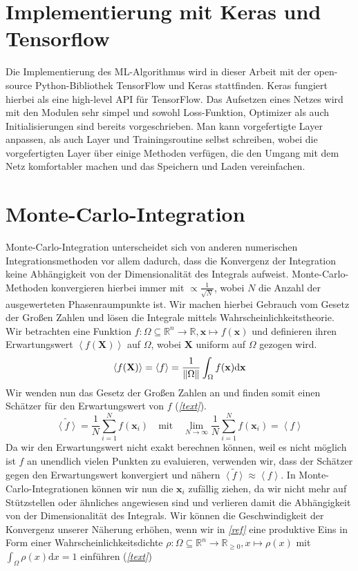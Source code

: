 \section{Implementierung mit Keras und Tensorflow}
Die Implementierung des ML-Algorithmus wird in dieser Arbeit mit der open-source Python-Bibliothek TensorFlow und Keras stattfinden. Keras fungiert hierbei als eine high-level API für TensorFlow. Das Aufsetzen eines Netzes wird mit den Modulen sehr simpel und sowohl Loss-Funktion, Optimizer als auch Initialisierungen sind bereits vorgeschrieben. Man kann vorgefertigte Layer anpassen, als auch Layer und Trainingsroutine selbst schreiben, wobei die vorgefertigten Layer über einige Methoden verfügen, die den Umgang mit dem Netz komfortabler machen und das Speichern und Laden vereinfachen. 
\section{Monte-Carlo-Integration}
Monte-Carlo-Integration unterscheidet sich von anderen numerischen Integrationsmethoden vor allem dadurch, dass die Konvergenz der Integration keine Abhängigkeit von der Dimensionalität des Integrals aufweist. Monte-Carlo-Methoden konvergieren hierbei immer mit $\propto \frac{1}{\sqrt{N}} $, wobei $N$ die Anzahl der ausgewerteten Phasenraumpunkte ist. Wir machen hierbei Gebrauch vom Gesetz der Großen Zahlen und lösen die Integrale mittels Wahrscheinlichkeitstheorie. \\
\newline
Wir betrachten eine Funktion $f: \Omega \subseteq \mathbb{R}^n \rightarrow \mathbb{R}, \mathbf{x} \mapsto f(\mathbf{x})$ und definieren ihren Erwartungswert $\left\langle f(\mathbf{X})\right\rangle $ auf $\Omega$, wobei $\mathbf{X}$ uniform auf $\Omega$ gezogen wird.
\begin{equation}
\left\langle f(\mathbf{X})\right\rangle  = \left\langle f\right\rangle  = \frac{1}{\norm{\Omega}}\int_{\Omega} f(\mathbf{x}) \text{d}\mathbf{x} 
\end{equation}
Wir wenden nun das Gesetz der Großen Zahlen an und finden somit einen Schätzer für den Erwartungswert von $f$ (\textit{\autoref{text}}).
\begin{equation}
\tilde{\left\langle f \right\rangle } = \frac{1}{N} \sum_{i=1}^{N} f(\mathbf{x}_i) \quad \text{mit} \quad \lim_{N\rightarrow \infty} \frac{1}{N} \sum_{i=1}^{N} f(\mathbf{x}_i) = \left\langle f \right\rangle
\end{equation}
Da wir den Erwartungswert nicht exakt berechnen können, weil es nicht möglich ist $f$ an unendlich vielen Punkten zu evaluieren, verwenden wir, dass der Schätzer gegen den Erwartungswert konvergiert und nähern $ \tilde{\left\langle f \right\rangle } \approx \left\langle f \right\rangle$. In Monte-Carlo-Integrationen können wir nun die $\mathbf{x}_i$ zufällig ziehen, da wir nicht mehr auf Stützstellen oder ähnliches angewiesen sind und verlieren damit die Abhängigkeit von der Dimensionalität des Integrals. Wir können die Geschwindigkeit der Konvergenz unserer Näherung erhöhen, wenn wir in \textit{\autoref{ref}} eine produktive Eins in Form einer Wahrscheinlichkeitsdichte $\rho: \Omega \subseteq \mathbb{R}^n \to \mathbb{R}_{\geq 0}, x \mapsto \rho(x)$ mit $\int_{\Omega} \rho(x) \text{d}x = 1$ einführen (\textit{\autoref{text}})
